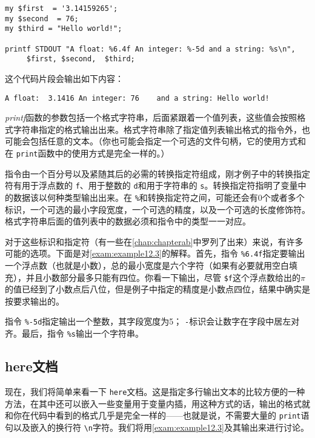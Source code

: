 \begin{lstlisting}
my $first  = '3.14159265';
my $second  = 76;
my $third = "Hello world!";

printf STDOUT "A float: %6.4f An integer: %-5d and a string: %s\n", 
     $first, $second,  $third;
\end{lstlisting}

这个代码片段会输出如下内容：

\begin{lstlisting}
A float:  3.1416 An integer: 76    and a string: Hello world!
\end{lstlisting}

\textit{printf}函数的参数包括一个格式字符串，后面紧跟着一个值列表，这些值会按照格式字符串指定的格式输出出来。格式字符串除了指定值列表输出格式的指令外，也可能会包括任意的文本。（你也可能会指定一个可选的文件句柄，它的使用方式和在 \verb|print|函数中的使用方式是完全一样的。）

指令由一个百分号以及紧随其后的必需的转换指定符组成，刚才例子中的转换指定符有用于浮点数的 \verb|f|、用于整数的 \verb|d|和用于字符串的 \verb|s|。转换指定符指明了变量中的数据该以何种类型输出出来。在 \verb|%|和转换指定符之间，可能还会有0个或者多个标识，一个可选的最小字段宽度，一个可选的精度，以及一个可选的长度修饰符。格式字符串后面的值列表中的数据必须和指令中的类型一一对应。

对于这些标识和指定符（有一些在\autoref{chap:chapterab}中罗列了出来）来说，有许多可能的选项。下面是对\autoref{exam:example12.3}的解释。首先，指令 \verb|%6.4f|指定要输出一个浮点数（也就是小数），总的最小宽度是六个字符（如果有必要就用空白填充），并且小数部分最多只能有四位。你看一下输出，尽管 \verb|$f|这个浮点数给出的$\pi$的值已经到了小数点后八位，但是例子中指定的精度是小数点四位，结果中确实是按要求输出的。

指令 \verb|%-5d|指定输出一个整数，其字段宽度为5； \verb|-|标识会让数字在字段中居左对齐。最后，指令 \verb|%s|输出一个字符串。

\subsection{here文档}
现在，我们将简单来看一下 \verb|here|文档。这是指定多行输出文本的比较方便的一种方法，在其中还可以嵌入一些变量用于变量内插，用这种方式的话，输出的格式就和你在代码中看到的格式几乎是完全一样的——也就是说，不需要大量的 \verb|print|语句以及嵌入的换行符 \verb|\n|字符。我们将用\autoref{exam:example12.3}及其输出来进行讨论。



